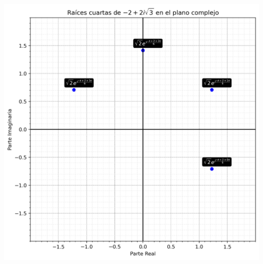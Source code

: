 \begin{homeworkProblem}
\begin{solution}
\begin{enumerate}
\begin{center}
          \includegraphics[scale=0.4]{images/grafico_raices_cuartas_-2+2isqrt3.png}  
        \end{center}
    \end{enumerate}
  \end{solution}
\end{homeworkProblem}

